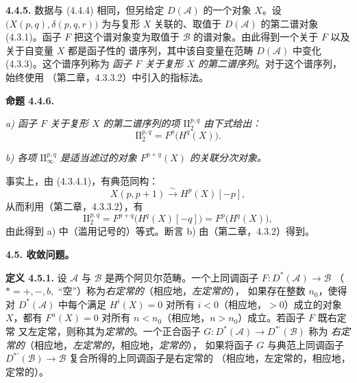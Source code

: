 \clearpage
{}%
\begingroup\small\setlength{\parskip}{0pt}\setlength{\emergencystretch}{1.5em}
\setlength{\abovedisplayskip}{4pt plus 2pt minus 2pt}%
\setlength{\belowdisplayskip}{4pt plus 2pt minus 2pt}%

\noindent\textbf{4.4.5.}\quad
数据与 (4.4.4) 相同，但另给定 $D(\mathcal A)$ 的一个对象 $X$。设
$\bigl(X(p,q),\delta(p,q,r)\bigr)$ 为与复形 $X$ 关联的、取值于
$D(\mathcal A)$ 的第二谱对象 (4.3.1)。函子 $F$ 把这个谱对象变为取值于
$\mathcal B$ 的谱对象。由此得到一个关于 $F$ 以及关于自变量 $X$ 都是函子性的
谱序列，其中该自变量在范畴 $D(\mathcal A)$ 中变化 (4.3.3)。这个谱序列称为
\emph{函子 $F$ 关于复形 $X$ 的第二谱序列}。对于这个谱序列，始终使用
（第二章，4.3.3.2）中引入的指标法。

\medskip\noindent\textbf{命题 4.4.6.}\quad

\noindent\textit{a) 函子 $F$ 关于复形 $X$ 的第二谱序列的项
$\mathrm{II}_2^{p,q}$ 由下式给出：}
\[
\mathrm{II}_2^{p,q}=F^p\bigl(H^q(X)\bigr).
\]

\noindent\textit{b) 各项 $\mathrm{II}_{\infty}^{p,q}$ 是适当滤过的对象
$F^{p+q}(X)$ 的关联分次对象。}

事实上，由 (4.3.4.1)，有典范同构：
\[
X(p,p+1)\xrightarrow{\sim}H^p(X)[-p],
\]
从而利用（第二章，4.3.3.2），有
\[
\mathrm{II}_2^{p,q}
=F^{p+q}\bigl(H^q(X)[-q]\bigr)
=F^p\bigl(H^q(X)\bigr),
\]
由此得到 a) 中（滥用记号的）等式。断言 b) 由（第二章，4.3.2）得到。

\medskip\noindent\textbf{4.5. 收敛问题。}

\noindent\textbf{定义 4.5.1.}\quad
设 $\mathcal A$ 与 $\mathcal B$ 是两个阿贝尔范畴。一个上同调函子
$F\colon D^*(\mathcal A)\longrightarrow\mathcal B$
（$*=+,-,b,{}$ ``空''）称为\emph{右定常的}（相应地，\emph{左定常的}），
如果存在整数 $n_0$，使得对 $D^*(\mathcal A)$ 中每个满足
$H^i(X)=0$ 对所有 $i<0$（相应地，$>0$）成立的对象 $X$，都有
$F^n(X)=0$ 对所有 $n<n_0$（相应地，$n>n_0$）成立。若函子 $F$ 既右定常
又左定常，则称其为\emph{定常的}。一个正合函子
$G\colon D^*(\mathcal A)\longrightarrow D^{*'}(\mathcal B)$ 称为
\emph{右定常的}（相应地，\emph{左定常的}，相应地，\emph{定常的}），
如果将函子 $G$ 与典范上同调函子
$D^{*'}(\mathcal B)\longrightarrow\mathcal B$ 复合所得的上同调函子是右定常的
（相应地，左定常的，相应地，定常的）。
\endgroup
